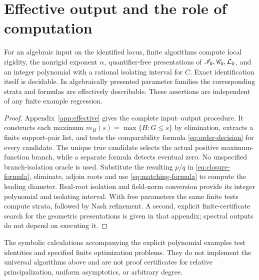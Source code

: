 \section{Effective output and the role of computation}\label{sec:effective}
\begin{theorem}\label{thm:effective}
For an algebraic input on the identified locus, finite algorithms compute
local rigidity, the nonrigid exponent $\alpha$, quantifier-free
presentations of $\mathscr I_0,\mathscr C_0,\mathcal L_0$, and an integer polynomial
with a rational isolating interval for $C$. Exact identification itself
is decidable. In algebraically presented parameter families the
corresponding strata and formulas are effectively describable. These
assertions are independent of any finite example regression.
\end{theorem}
\begin{proof}
Appendix~\ref{app:effective} gives the complete input--output procedure.
It constructs each maximum $m_H(s)=\max\{H:G\le s\}$ by elimination,
extracts a finite support-pair list, and tests the comparability formula
\eqref{eq:order-decision} for every candidate. The unique true candidate
selects the actual positive maximum-function branch, while a separate
formula detects eventual zero. No unspecified branch-isolation oracle is
used. Substitute the resulting $p/q$ in \eqref{eq:closure-formula},
eliminate, adjoin roots and use \eqref{eq:matching-formula} to compute the
leading diameter. Real-root isolation and field-norm conversion provide
its integer polynomial and isolating interval. With free parameters the
same finite tests compute strata, followed by Nash refinement. A second,
explicit finite-certificate search for the geometric presentations is
given in that appendix; spectral outputs do not depend on executing it.
\end{proof}

The symbolic calculations accompanying the explicit polynomial examples
test identities and specified finite optimization problems. They do not
implement the universal algorithms above and are not proof certificates
for relative principalization, uniform asymptotics, or arbitrary degree.
